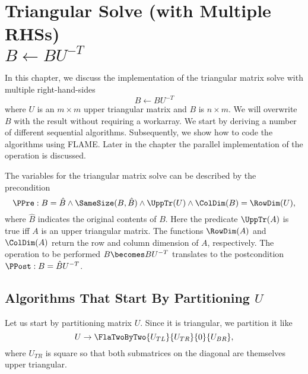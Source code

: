 %
%


\chapter{Triangular Solve (with Multiple RHSs)\\
$ B \leftarrow B U^{-T} $ }
\label{chapter:trsm_rut}






In this chapter, we discuss the implementation of the triangular matrix
solve with multiple right-hand-sides
\[
B \leftarrow B U^{-T}
\]
where $ U $ is an $ m \times m $ upper triangular matrix and $ B $ is
$ n \times m $.  We will overwrite $ B $ with the result without
requiring a workarray.  We start by deriving a number of different
sequential algorithms.  Subsequently, we show how to code the
algorithms using FLAME.  Later in the chapter the parallel
implementation of the operation is discussed.

The variables for the triangular matrix solve can be
described by the precondition
\[
\PPre:
B = \hat{B} \wedge \SameSize( B, \hat{B} ) \wedge \UppTr( U ) \wedge
\ColDim( B )=\RowDim( U ),
\]
where $ \hat{B} $ indicates the original contents of $ B $.  Here the
predicate $ \UppTr( A ) $ is true iff $ A $ is an upper triangular
matrix.  The functions $ \RowDim( A ) $ and $ \ColDim( A ) $ return
the row and column dimension of $ A $, respectively.  The operation to
be performed $ B \becomes B U^{-T} $ translates to the postcondition $
\PPost: B = \hat{B} U^{-T}$.

\section{Algorithms That Start By Partitioning $ U $}
\label{sec:trsm_rut:U}

Let us start by partitioning matrix $ U $.  Since it is triangular, we
partition it like
\[
U \rightarrow \FlaTwoByTwo{ U_{TL} }{ U_{TR} }
                          {   0    }{ U_{BR} },
\]
where $ U_{TR} $ is square so that both submatrices on the diagonal
are themselves upper triangular.

